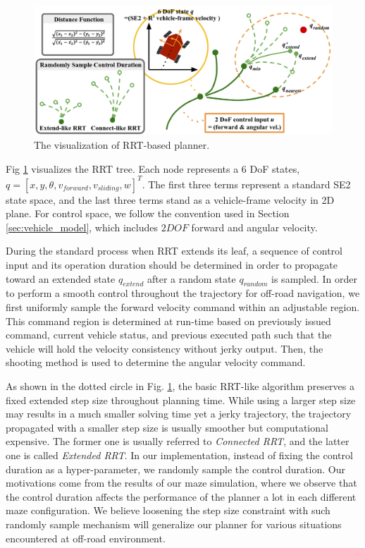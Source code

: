 \documentclass[../thesis.tex]{subfiles}
\begin{document}
\begin{figure}[t]
	\begin{center}
		\centerline{\includegraphics[width=0.8\columnwidth]{./RRTPlanner/fig/rrt.png}}
		\caption{The visualization of RRT-based planner.}
		\label{fig:rrt}
	\end{center}
\end{figure} 

Fig \ref{fig:rrt} visualizes the RRT tree. Each node represents a $6$ DoF states, $q=[x,y, \theta ,v_{forward}, v_{sliding}, w]^T$. The first three terms represent a standard SE2 state space, and the last three terms stand as a vehicle-frame velocity in 2D plane. For control space, we follow the convention used in Section \ref{sec:vehicle_model}, which includes $2DOF$ forward and angular velocity.

During the standard process when RRT extends its leaf, a sequence of control input and its operation duration should be determined in order to propagate toward an extended state $q_{extend}$ after a random state $q_{random}$ is sampled. 
In order to perform a smooth control throughout the trajectory for off-road navigation, we first uniformly sample the forward velocity command within an adjustable region. 
This command region is determined at run-time based on previously issued command, current vehicle status, and previous executed path such that the vehicle will hold the velocity consistency without jerky output. 
Then, the shooting method is used to determine the angular velocity command.

As shown in the dotted circle in Fig. \ref{fig:rrt}, the basic RRT-like algorithm preserves a fixed extended step size throughout planning time. 
While using a larger step size may results in a much smaller solving time yet a jerky trajectory, the trajectory propagated with a smaller step size is usually smoother but computational expensive. 
The former one is usually referred to \textit{Connected RRT}, and the latter one is called \textit{Extended RRT}. 
In our implementation, instead of fixing the control duration as a hyper-parameter, we randomly sample the control duration. 
Our motivations come from the results of our maze simulation, where we observe that the control duration affects the performance of the planner a lot in each different maze configuration. 
We believe loosening the step size constraint with such randomly sample mechanism will generalize our planner for various situations encountered at off-road environment. 
\end{document}
